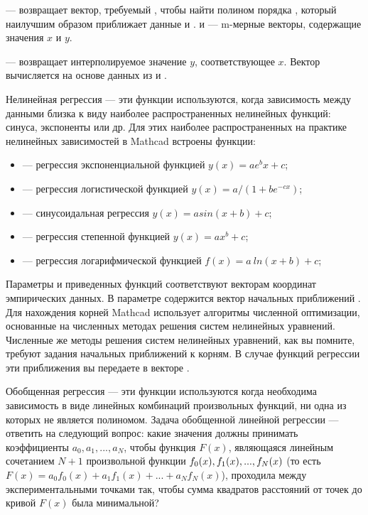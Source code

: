  --- возвращает вектор, требуемый , чтобы найти полином порядка , который наилучшим образом приближает данные  и .  и  --- m-мерные векторы, содержащие значения $x$ и $y$.

 --- возвращает интерполируемое значение $y$, соответствующее $x$. Вектор  вычисляется  на основе данных из  и .


Нелинейная регрессия --- эти функции используются, когда зависимость между данными близка к виду наиболее распространенных нелинейных функций: синуса, экспоненты или др. Для этих наиболее распространенных на практике нелинейных зависимостей в Mathcad встроены функции: 
\begin{itemize}
	\item {} --- регрессия  экспоненциальной функцией $y(x)=a e^b x+c$;
	\item {} --- регрессия логистической функцией $y(x)=a/(1+b e^{-c x})$;
	\item {} --- синусоидальная регрессия $y(x)=a sin(x+b)+c$;
	\item {} --- регрессия степенной функцией $y(x)=a x^b+c$;
	\item {} --- регрессия логарифмической функцией $f(x)=a\ ln(x+b)+c$;
\end{itemize}

Параметры  и  приведенных функций соответствуют векторам координат эмпирических данных. В параметре  содержится вектор начальных приближений . Для нахождения корней Mathcad использует алгоритмы численной оптимизации, основанные на численных методах решения систем нелинейных уравнений. Численные же методы решения систем нелинейных уравнений, как вы помните, требуют задания начальных приближений к корням. В случае функций регрессии эти приближения вы передаете в векторе .

Обобщенная регрессия --- эти функции используются когда необходима зависимость в виде линейных комбинаций произвольных функций, ни одна из которых не является полиномом.
Задача обобщенной линейной регрессии --- ответить на следующий вопрос: какие значения должны принимать коэффициенты $a_0, a_1, ..., a_N$, чтобы функция $F(x)$, являющаяся линейным сочетанием $N+1$ произвольной функции $f_0(x), f_1(x),\\ ..., f_N(x)$ (то есть  $F(x)=a_0 f_0(x)+a_1 f_1(x)+ ... + a_N f_N(x)$), проходила между экспериментальными точками так, чтобы сумма квадратов расстояний от точек до кривой $F(x)$ была минимальной?

